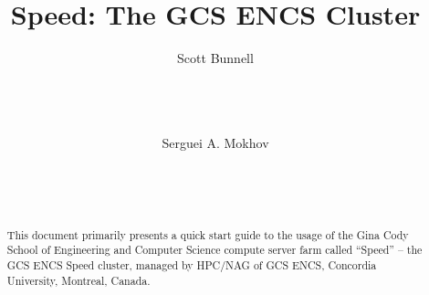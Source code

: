 \documentclass{easychair}
\begin{document}
%
\title{Speed: The GCS ENCS Cluster}

%

%
\author{
    Scott Bunnell\\
    \\
    \\
    \\
\and
    Serguei A. Mokhov\\
    \\
    \\
    \\
}

%

\maketitle

\begin{abstract}
This document primarily presents a quick start
guide to the usage of the Gina Cody School of
Engineering and Computer Science compute server farm
called ``Speed'' -- the GCS ENCS Speed cluster,
managed by HPC/NAG of GCS ENCS, Concordia University,
Montreal, Canada.
\end{abstract}

\tableofcontents
\clearpage
\end{document}
